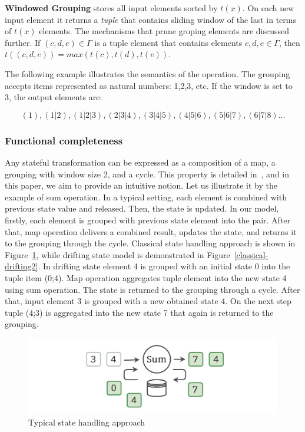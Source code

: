 {\bf Windowed Grouping} stores all input elements sorted by $t(x)$. On each new input element it returns a {\em tuple} that contains sliding window of the last in terms of $t(x)$ elements. The mechanisms that prune groping elements are discussed further. If $(c,d,e)\in \Gamma$ is a tuple element that contains elements $c,d,e \in \Gamma$, then $t((c,d,e))=max(t(c),t(d),t(e))$. 

The following example illustrates the semantics of the operation. The grouping accepts items represented as natural numbers: 1,2,3, etc. If the window is set to 3, the output elements are:

\[(1), (1|2), (1|2|3), (2|3|4), (3|4|5), (4|5|6), (5|6|7), (6|7|8)...\]

\subsubsection{Functional completeness}

Any stateful transformation can be expressed as a composition of a map, a grouping with window size 2, and a cycle. This property is detailed in~\cite{we2018adbis}, and in this paper, we aim to provide an intuitive notion. Let us illustrate it by the example of sum operation. In a typical setting, each element is combined with previous state value and released. Then, the state is updated. In our model, firstly, each element is grouped with previous state element into the pair. After that, map operation delivers a combined result, updates the state, and returns it to the grouping through the cycle. Classical state handling approach is shown in Figure~\ref{classical-drifting}, while drifting state model is demonstrated in Figure~\ref{classical-drifting2}. In drifting state element 4 is grouped with an initial state 0 into the tuple item (0;4). Map operation aggregates tuple element into the new state 4 using sum operation. The state is returned to the grouping through a cycle. After that, input element 3 is grouped with a new obtained state 4. On the next step tuple (4;3) is aggregated into the new state 7 that again is returned to the grouping.   

\begin{figure}[htbp]
  \centering
  \includegraphics[width=\columnwidth]{pics/classical-drifting}
  \caption{Typical state handling approach}
  \label {classical-drifting}
\end{figure}

